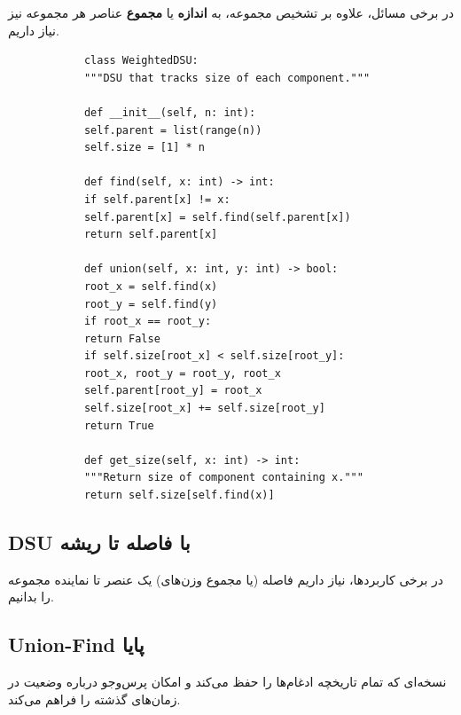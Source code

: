 \documentclass{matinbook}
\begin{document}
    در برخی مسائل، علاوه بر تشخیص مجموعه،
    به \textbf{اندازه} یا \textbf{مجموع} عناصر
    هر مجموعه نیز نیاز داریم.
    
    \begin{latin}
        \begin{verbatim}
            class WeightedDSU:
            """DSU that tracks size of each component."""
            
            def __init__(self, n: int):
            self.parent = list(range(n))
            self.size = [1] * n
            
            def find(self, x: int) -> int:
            if self.parent[x] != x:
            self.parent[x] = self.find(self.parent[x])
            return self.parent[x]
            
            def union(self, x: int, y: int) -> bool:
            root_x = self.find(x)
            root_y = self.find(y)
            if root_x == root_y:
            return False
            if self.size[root_x] < self.size[root_y]:
            root_x, root_y = root_y, root_x
            self.parent[root_y] = root_x
            self.size[root_x] += self.size[root_y]
            return True
            
            def get_size(self, x: int) -> int:
            """Return size of component containing x."""
            return self.size[self.find(x)]
        \end{verbatim}
    \end{latin}
    \label{code:dsu-weighted}
    
    \subsection{DSU با فاصله تا ریشه}
    
    در برخی کاربردها، نیاز داریم
    فاصله (یا مجموع وزن‌های) یک عنصر
    تا نماینده مجموعه را بدانیم.
    
    \subsection{Union-Find پایا}
    
    \begin{definition}
        نسخه‌ای که تمام تاریخچه ادغام‌ها
        را حفظ می‌کند و امکان پرس‌وجو
        درباره وضعیت در زمان‌های گذشته
        را فراهم می‌کند.
        \label{def:persistent-union-find}
    \end{definition}
    
\end{document}
